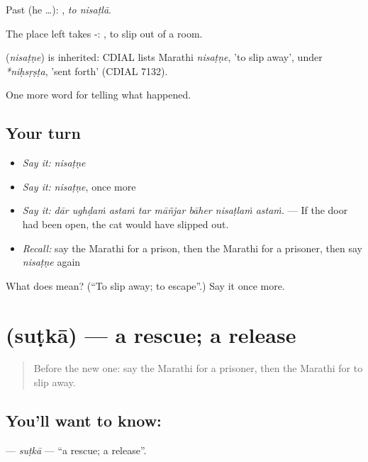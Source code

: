 Past (he …):  , \emph{to nisaṭlā}.

The place left takes -:  , to slip out of a room.

\begin{cousinweb}
\textbf{} (\emph{nisaṭṇe}) is inherited: CDIAL lists Marathi \emph{nisaṭṇe}, 'to slip away', under \emph{*niḥsṛṣṭa}, 'sent forth' (CDIAL 7132).
\end{cousinweb}

\begin{grammarlens}[title={What you've built}]
One more word for telling what happened.
\end{grammarlens}

\subsection*{Your turn}
\begin{itemize}
\raggedright
  \item \emph{Say it:} \emph{nisaṭṇe}
  \item \emph{Say it:} \emph{nisaṭṇe}, once more
  \item \emph{Say it:} \emph{dār ughḍaṁ astaṁ tar māñjar bāher nisaṭlaṁ astaṁ.} — If the door had been open, the cat would have slipped out.
  \item \emph{Recall:} say the Marathi for a prison, then the Marathi for a prisoner, then say \emph{nisaṭṇe} again
\end{itemize}

\begin{tcolorbox}[breakable,colback=teal!4,colframe=teal!35!black,title={Before you move on}]
What does  mean? (\textquotedblleft{}To slip away; to escape\textquotedblright{}.) Say it once more.
\end{tcolorbox}
\section[\texorpdfstring{\mr{सुटका} (suṭkā)}{सुटका (suṭkā)}]{ (suṭkā) — a rescue; a release}

\label{lesson:MR-C291-sutka}



\begin{quote}
Before the new one: say the Marathi for a prisoner, then the Marathi for to slip away.
\end{quote}

\subsection*{You'll want to know: }
\textbf{} — \emph{suṭkā} — \textquotedblleft{}a rescue; a release\textquotedblright{}.

